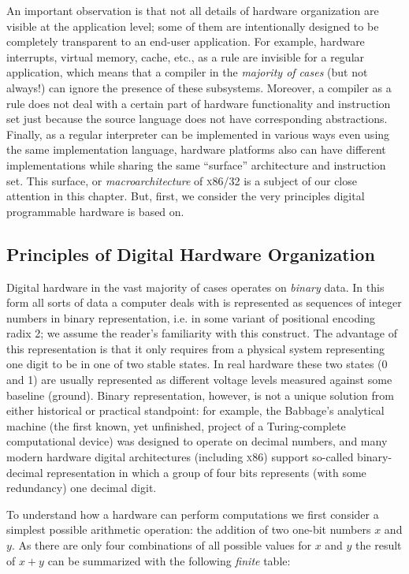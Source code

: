 An important observation is that not all details of hardware organization are visible at the application level; some of them are intentionally
designed to be completely transparent to an end-user application. For example, hardware interrupts, virtual memory, cache, etc., as a rule are
invisible for a regular application, which means that a compiler in the \emph{majority of cases} (but not always!) can ignore the presence of
these subsystems. Moreover, a compiler as a rule does not deal with a certain part of hardware functionality and instruction set just
because the source language does not have corresponding abstractions. Finally, as a regular interpreter can be implemented in
various ways even using the same implementation language, hardware platforms also can have different implementations while sharing
the same ``surface'' architecture and instruction set. This surface, or \emph{macroarchitecture} of \textsc{x86/32} is a subject
of our close attention in this chapter. But, first, we consider the very principles digital programmable hardware is based on.

\subsection{Principles of Digital Hardware Organization}

Digital hardware in the vast majority of cases operates on \emph{binary} data. In this form all sorts of data a computer
deals with is represented as sequences of integer numbers in binary representation, i.e. in some variant of positional
encoding radix 2; we assume the reader's familiarity with this construct. The advantage of this representation
is that it only requires from a physical system representing one digit to be in one of two stable states. In real
hardware these two states (0 and 1) are usually represented as different voltage levels measured against some
baseline (ground). Binary representation, however, is not a unique solution from either historical or practical
standpoint: for example, the Babbage's analytical machine (the first known, yet unfinished, project of
a Turing-complete computational device) was designed to operate on decimal numbers, and many modern hardware
digital architectures (including \textsc{x86}) support so-called binary-decimal representation in which
a group of four bits represents (with some redundancy) one decimal digit.

To understand how a hardware can perform computations we first consider a simplest possible arithmetic operation: the
addition of two one-bit numbers $x$ and $y$. As there are only four combinations of all possible values for $x$ and $y$
the result of $x+y$ can be summarized with the following \emph{finite} table:

